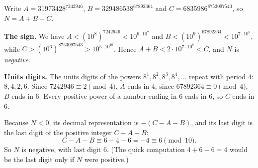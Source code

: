 Write $A=31973428^{7242946}$, $B=329486538^{67892364}$ and $C=6835986^{8753097543}$, so $N=A+B-C$.

\textbf{The sign.} We have $A<\left(10^8\right)^{7242946}<10^{6\cdot10^7}$ and $B<\left(10^9\right)^{67892364}<10^{7\cdot10^8}$, while $C>\left(10^6\right)^{8753097543}>10^{5\cdot10^{10}}$. Hence $A+B<2\cdot10^{7\cdot10^8}<C$, and $N$ is \emph{negative}.

\textbf{Units digits.} The units digits of the powers $8^1,8^2,8^3,8^4,\dots$ repeat with period $4$: $8,4,2,6$. Since $7242946\equiv2\pmod4$, $A$ ends in $4$; since $67892364\equiv0\pmod4$, $B$ ends in $6$. Every positive power of a number ending in $6$ ends in $6$, so $C$ ends in $6$.

Because $N<0$, its decimal representation is $-(C-A-B)$, and its last digit is the last digit of the positive integer $C-A-B$:
\[
C-A-B\equiv6-4-6=-4\equiv6\pmod{10}.
\]
So $N$ is $\boxed{\text{negative, with last digit }6}$. (The quick computation $4+6-6=4$ would be the last digit only if $N$ were positive.)
